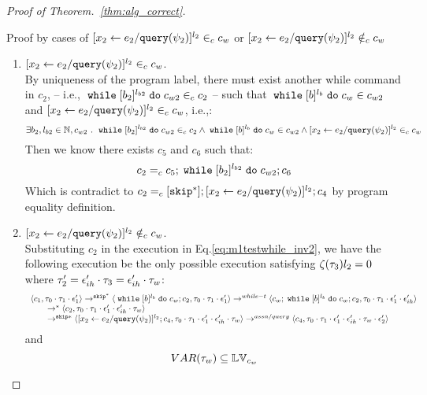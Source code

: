 \begin{proof}[Proof of Theorem.~\ref{thm:alg_correct}]
\begin{case}
\begin{subcase}
\begin{subsubcase}
\begin{subsubsubcase}
\begin{subproof}
\begin{equation}
\end{equation}
%
Proof by cases of $[\mathrel{ {x}_2 \leftarrow e_2 / {\tt query}(\psi_2) }]^{l_2} \in_c c_w$ or 
$[\mathrel{ {x}_2 \leftarrow e_2 / {\tt query}(\psi_2) }]^{l_2} \notin_c c_w$
\begin{enumerate}
  \item $[\mathrel{ {x}_2 \leftarrow e_2 / {\tt query}(\psi_2) }]^{l_2} \in_c c_w$.
  \\
  By uniqueness of the program label, there must exist another while command in $c_2$, -- i.e., $\;\mathtt{while}\; [b_2]^{l_{b2}} \;\mathtt{do}\; c_{w2} \in_c c_2$ --
    such that 
  $\;\mathtt{while}\; [b]^{l_b} \;\mathtt{do}\; c_w \in c_{w2}$ and $[\mathrel{ {x}_2 \leftarrow e_2 / {\tt query}(\psi_2) }]^{l_2} \in_c c_w$, i.e.,:
  \[
  \exists b_2, l_{b2} \in \mathbb{N}, c_{w2} ~.~ 
  \;\mathtt{while}\; [b_2]^{l_{b2}} \;\mathtt{do}\; c_{w2} \in_c c_2 
  \land \;\mathtt{while}\; [b]^{l_b} \;\mathtt{do}\; c_w \in c_{w2}
  \land [\mathrel{ {x}_2 \leftarrow e_2 / {\tt query}(\psi_2) }]^{l_2} \in_c c_w
  \]
%
Then we know there exists $c_5$ and $c_6$ such that:
\[
  c_2 =_c c_5; \;\mathtt{while}\; [b_2]^{l_{b2}} \;\mathtt{do}\; c_{w2};c_6
\]
Which is contradict to $c_2 =_c [\mathtt{skip}^*];[\mathrel{ {x}_2 \leftarrow e_2 / {\tt query}(\psi_2) }]^{l_2};{c}_4$ by program equality definition.
%
%
 \item $[\mathrel{ {x}_2 \leftarrow e_2 / {\tt query}(\psi_2) }]^{l_2} \notin_c c_w$.
%
\\
%
Substituting $c_2$ in the execution in Eq.\ref{eq:m1testwhile_inv2}, we have the following execution be the only possible execution satisfying $\mathtt{\zeta}(\mathtt{\tau}_3) l_2 = 0$ where $\mathtt{\tau}_2' = \mathtt{\epsilon}_{ih}' \cdot \mathtt{\tau}_3 = \mathtt{\epsilon}_{ih}' \cdot \mathtt{\tau}_w$:
\[
    \begin{array}{l}   
  \langle c_1, \mathtt{\tau}_0 \cdot \mathtt{\tau}_1 \cdot \mathtt{\epsilon}_1' \rangle 
  \rightarrow^{\mathtt{skip}^*} 
  \langle \;\mathtt{while}\; [b]^{l_b} \;\mathtt{do}\; c_w;{c}_2, \mathtt{\tau}_0 \cdot \mathtt{\tau}_1 \cdot \mathtt{\epsilon}_1' \rangle 
  \rightarrow^{while-t} 
  \langle c_w;\;\mathtt{while}\; [b]^{l_b} \;\mathtt{do}\; c_w;c_2, \mathtt{\tau}_0 \cdot \mathtt{\tau}_1 \cdot \mathtt{\epsilon}_1' \cdot \mathtt{\epsilon}_{ih}' \rangle 
  \\
  \qquad \rightarrow^{*} 
  \langle c_2,\mathtt{\tau}_0 \cdot \mathtt{\tau}_1 \cdot \mathtt{\epsilon}_1' \cdot \mathtt{\epsilon}_{ih}' \cdot \mathtt{\tau}_w \rangle
  \\
  \qquad \rightarrow^{\mathtt{skip}*} 
  \langle [\mathrel{ {x}_2 \leftarrow e_2 / {\tt query}(\psi_2) }]^{l_2};{c}_4, 
  \mathtt{\tau}_0 \cdot \mathtt{\tau}_1 \cdot \mathtt{\epsilon}_1' \cdot \mathtt{\epsilon}_{ih}' \cdot \mathtt{\tau}_w \rangle
  \rightarrow^{assn/query} 
  \langle {c}_4,  \mathtt{\tau}_0 \cdot \mathtt{\tau}_1 \cdot \mathtt{\epsilon}_1' \cdot \mathtt{\epsilon}_{ih}' \cdot \mathtt{\tau}_w \cdot \mathtt{\epsilon}_2' \rangle 
\end{array}
\]
and
\[
  VAR{(\mathtt{\tau}_w)} \subseteq \mathbb{LV}_{c_w}
\]
%

\end{enumerate}
\end{subproof}
\end{subsubsubcase}
\end{subsubcase}
\end{subcase}
\end{case}
\end{proof}
